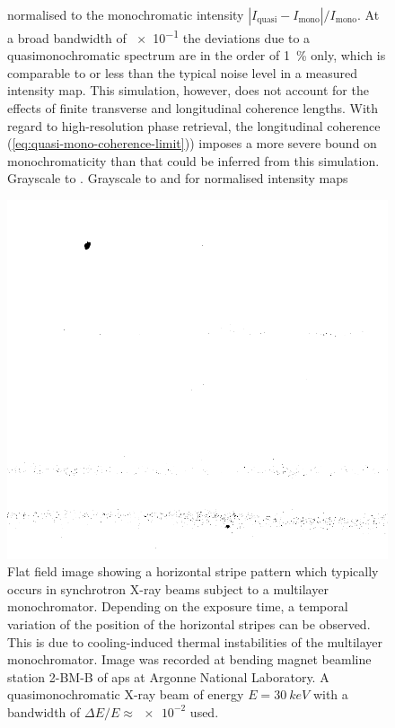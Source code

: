 \documentclass[
twoside,
openright,
titlepage,
numbers=noenddot,
headinclude,
fleqn,
a4paper,
footinclude=true,
cleardoublepage=empty,
abstractoff,
BCOR=5mm,
paper=a4,
fontsize=11pt,
british,ngerman,american,
]{scrreprt}
\begin{document}
\begin{figure}
{      normalised to the monochromatic intensity
      $|I_{\mathrm{quasi}}-I_{\mathrm{mono}}|/I_{\mathrm{mono}}$.  At
      a broad bandwidth of \num{e-1} the deviations due to a
      quasimonochromatic spectrum are in the order of \SI{1}{\percent}
      only, which is comparable to or less than the typical noise
      level in a measured intensity map.  This simulation, however,
      does not account for the effects of finite transverse and
      longitudinal coherence lengths.  With regard to high-resolution
      phase retrieval, the longitudinal coherence
      (\cref{eq:quasi-mono-coherence-limit})) imposes a more severe
      bound on monochromaticity than that could be inferred from this
      simulation.   Grayscale to
      .  Grayscale to  and
       for normalised intensity maps %
}
  \label{fig:quasimono-int}
\end{figure}  


\begin{figure}
  \centering
  \includegraphics[width=.5\textwidth]
  {figures/FlatField/Fig01_16-bit.png}
  \caption[Flat field from a multilayer monochromator.]{Flat field
    image showing a horizontal stripe pattern which typically occurs
    in synchrotron X-ray beams subject to a multilayer monochromator.
    Depending on the exposure time, a temporal variation of the
    position of the horizontal stripes can be observed.  This is due
    to cooling-induced thermal instabilities of the multilayer
    monochromator.  Image was recorded at bending magnet beamline
    station 2-BM-B of \ac{aps} at Argonne National Laboratory. A
    quasimonochromatic X-ray beam of energy $E = \SI{30}{keV}$ with a
    bandwidth of $\Delta E/E \approx \num{e-2}$ used.}
  \label{fig:flat-field}
\end{figure}
\end{document}
